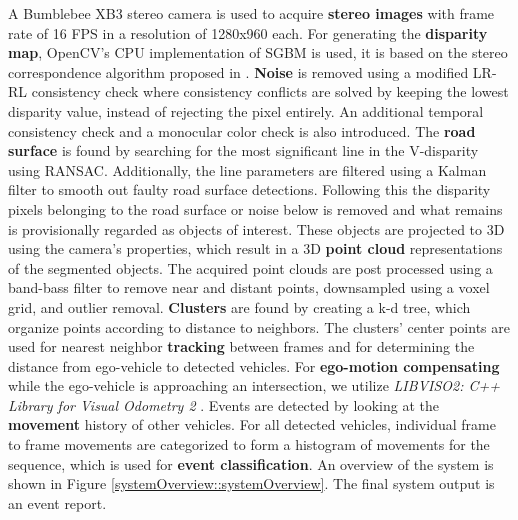 \vspace*{-1.5mm}
\begin{multicols}{2}   
A Bumblebee XB3 stereo camera is used to acquire \textbf{stereo images} with frame rate of 16 FPS in a resolution of 1280x960 each. For generating the \textbf{disparity map}, OpenCV's CPU implementation of  SGBM is used, it is based on the stereo correspondence algorithm proposed in \cite{HirschmullerRLandSGBM}. \textbf{Noise} is removed using a modified LR-RL consistency check where consistency conflicts are solved by keeping the lowest disparity value, instead of rejecting the pixel entirely. An additional temporal consistency check and a monocular color check is also introduced.
The \textbf{road surface} is found by searching for the most significant line in the V-disparity \cite{labayrade2002real} using RANSAC. Additionally, the line parameters are filtered using a Kalman filter to smooth out faulty road surface detections. Following this the disparity pixels belonging to the road surface or noise below is removed and what remains is provisionally regarded as objects of interest. These objects are projected to 3D using the camera's properties, which result in a 3D \textbf{point cloud} representations of the segmented objects.
The acquired point clouds are post processed using a band-bass filter to remove near and distant points, downsampled using a voxel grid, and outlier removal. \textbf{Clusters} are found by creating a k-d tree, which organize points according to distance to neighbors. The clusters' center points are used for nearest neighbor \textbf{tracking} between frames and for determining the distance from ego-vehicle to detected vehicles.
For \textbf{ego-motion compensating} while the ego-vehicle is approaching an intersection, we utilize \textit{LIBVISO2: C++ Library for Visual Odometry 2} \cite{Geiger2011IV}. 
Events are detected by looking at the \textbf{movement} history of other vehicles. For all detected vehicles, individual frame to frame movements are categorized to form a histogram of movements for the sequence, which is used for \textbf{event classification}.
An overview of the system is shown in Figure \ref{systemOverview::systemOverview}. The final system output is an event report.
\end{multicols}

